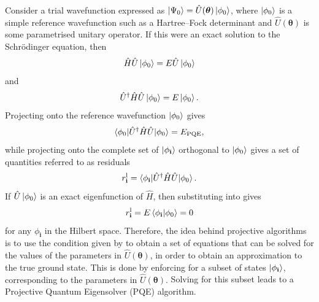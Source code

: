 \documentclass[%
 reprint,
 amsmath,amssymb,
 aps,
]{revtex4-2}
\begin{document}
Consider a trial wavefunction expressed as \mbox{$\ket{\Psi_0} =\hat U (\boldsymbol\theta)\ket{\phi_0}$}, where $\ket{\phi_0}$ is a simple reference wavefunction such as a Hartree--Fock determinant and $\hat U(\mathbf{\boldsymbol\theta})$ is some parametrised unitary operator.
If this were an exact solution to the Schr\"odinger equation, then
\begin{equation}
\hat H \hat U \ket{\phi_0} = E \hat U\ket{\phi_0}
\end{equation}
and
\begin{equation}
\hat U^\dagger \hat H \hat U \ket{\phi_0} = E \ket{\phi_0}.
\label{eq:linked}
\end{equation}
Projecting  onto the reference wavefunction $\ket{\phi_0}$ gives
\begin{equation}
    \braket{\phi_0|\hat U^\dagger \hat H \hat U |\phi_0} = E_\mathrm{PQE},
    \label{eq:epqe}
\end{equation}
while projecting onto the complete set of $\ket{\phi_\mathbf{i}}$ orthogonal to $\ket{\phi_0}$ gives a set of { quantities referred to as residuals}
\begin{equation}
 r^\mathrm{l}_\mathbf{i} = \braket{\phi_\mathbf{i}|\hat U^\dagger \hat H \hat U |\phi_0}.
 \label{eq:lk_resid}
\end{equation}
{If  $\hat U\ket{\phi_0}$ is an exact eigenfunction of $\hat H$, then substituting  into  gives
\begin{equation}
    r^\mathrm{l}_\mathbf{i} = E\braket{\phi_\mathbf{i}|\phi_0} = 0
     \label{eq:resid}
\end{equation}
for any $\phi_\mathbf{i}$ in the Hilbert space. Therefore, the idea behind projective algorithms is to use the condition given by  to obtain a set of equations that can be solved for the values of the parameters in $\hat U(\boldsymbol \theta)$, in order to obtain an approximation to the true ground state. This is done by enforcing  for a subset of states $\ket{\phi_\mathbf{i}}$, corresponding to the parameters in $\hat U(\boldsymbol \theta)$.}  Solving  for this subset leads to a Projective Quantum Eigensolver (PQE)\cite{Stair2021} algorithm.
\end{document}
